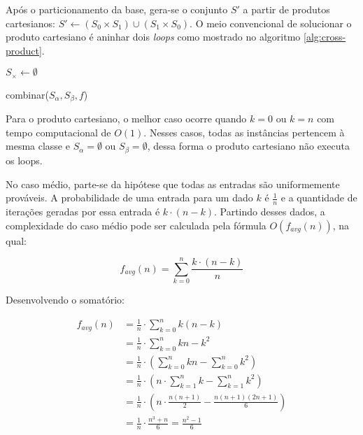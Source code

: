 Após o particionamento da base, gera-se o conjunto $S'$ a partir de produtos cartesianos: $S' \gets (S_0 \times S_1) \cup (S_1 \times S_0)$. O meio convencional de solucionar o produto cartesiano é aninhar dois \emph{loops} como mostrado no algoritmo \ref{alg:cross-product}.

\begin{function}

    $S_{\times} \gets \emptyset$



    \caption{combinar($S_{\alpha}, S_{\beta}, f$)}
    \label{alg:cross-product}
\end{function}

Para o produto cartesiano, o melhor caso ocorre quando $k = 0$ ou $k = n$ com tempo computacional de $O(1)$. Nesses casos, todas as instâncias pertencem à mesma classe e $S_{\alpha} = \emptyset$ ou $S_{\beta} = \emptyset$, dessa forma o produto cartesiano não executa os loops.

No caso médio, parte-se da hipótese que todas as entradas são uniformemente prováveis. A probabilidade de uma entrada para um dado $k$ é $\frac{1}{n}$ e a quantidade de iterações geradas por essa entrada é $k \cdot (n - k)$. Partindo desses dados, a complexidade do caso médio pode ser calculada pela fórmula $O(f_{avg}(n))$, na qual:

\[f_{avg}(n) = \sum_{k = 0}^{n} \frac{k \cdot (n - k)}{n}\]

Desenvolvendo o somatório:

\begin{align*}
    f_{avg}(n) &= \frac{1}{n} \cdot \sum_{k = 0}^{n} k(n - k) \\
               &= \frac{1}{n} \cdot \sum_{k = 0}^{n} kn - k^2 \\
               &= \frac{1}{n} \cdot \left(\sum_{k = 0}^{n} kn - \sum_{k = 0}^{n} k^2\right) \\
               &= \frac{1}{n} \cdot \left(n \cdot \sum_{k = 1}^{n} k - \sum_{k = 1}^{n} k^2\right) \\
               &= \frac{1}{n} \cdot \left(n \cdot \frac{n(n + 1)}{2} - \frac{n(n + 1)(2n + 1)}{6}\right) \\
               &= \frac{1}{n} \cdot \frac{n^3 + n}{6} = \frac{n^2 -1}{6}
\end{align*}

